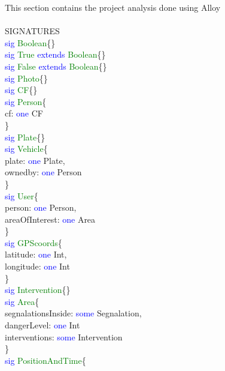 This section contains the project analysis done using Alloy\\
\\
SIGNATURES\\
\textcolor{blue}{sig}
\textcolor{green}{Boolean}\{\} \\
\textcolor{blue}{sig}
\textcolor{green}{True}
\textcolor{blue}{extends}
\textcolor{green}{Boolean}\{\} \\ 
\textcolor{blue}{sig}
\textcolor{green}{False}
\textcolor{blue}{extends}
\textcolor{green}{Boolean}\{\} \\
\textcolor{blue}{sig}
\textcolor{green}{Photo}\{\} \\
\textcolor{blue}{sig}
\textcolor{green}{CF}\{\} \\
\textcolor{blue}{sig}
\textcolor{green}{Person}\{ \\
cf: \textcolor{blue}{one} CF\\
\} \\
\textcolor{blue}{sig}
\textcolor{green}{Plate}\{\} \\
\textcolor{blue}{sig}
\textcolor{green}{Vehicle}\{ \\
plate: \textcolor{blue}{one} Plate,\\
ownedby: \textcolor{blue}{one} Person\\
\} \\
\textcolor{blue}{sig}
\textcolor{green}{User}\{ \\
person: \textcolor{blue}{one} Person,\\
areaOfInterest: \textcolor{blue}{one} Area\\ 
\} \\
\textcolor{blue}{sig}
\textcolor{green}{GPScoords}\{ \\
latitude: \textcolor{blue}{one} Int,\\
longitude: \textcolor{blue}{one} Int\\ 
\} \\
\textcolor{blue}{sig}
\textcolor{green}{Intervention}\{\} \\
\textcolor{blue}{sig}
\textcolor{green}{Area}\{ \\
segnalationsInside: \textcolor{blue}{some} Segnalation,\\
dangerLevel: \textcolor{blue}{one} Int\\ 
interventions: \textcolor{blue}{some} Intervention\\
\} \\
\textcolor{blue}{sig}
\textcolor{green}{PositionAndTime}\{ \\
